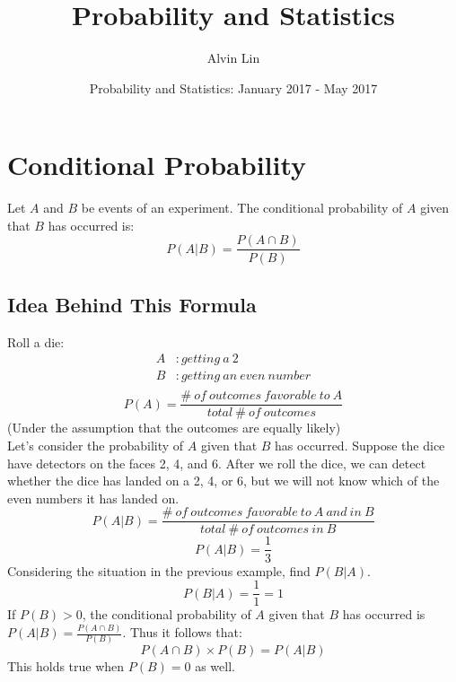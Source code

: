 \documentclass{math}
\title{Probability and Statistics}
\author{Alvin Lin}
\date{Probability and Statistics: January 2017 - May 2017}
\begin{document}
\maketitle

\section*{Conditional Probability}
Let \( A \) and \( B \) be events of an experiment. The conditional probability
of \( A \) given that \( B \) has occurred is:
\[ P(A|B) = \frac{P(A \cap B)}{P(B)} \]

\subsection*{Idea Behind This Formula}
Roll a die:
\begin{align*}
  A&: getting\ a\ 2 \\
  B&: getting\ an\ even\ number \\
\end{align*}
\[ P(A) = \frac{\#\ of\ outcomes\ favorable\ to\ A}{total\ \#\ of\ outcomes} \]
(Under the assumption that the outcomes are equally likely) \\

Let's consider the probability of \( A \) given that \( B \) has occurred.
Suppose the dice have detectors on the faces 2, 4, and 6. After we roll the
dice, we can detect whether the dice has landed on a 2, 4, or 6, but we will
not know which of the even numbers it has landed on.
\[ P(A|B) = \frac{\#\ of\ outcomes\ favorable\ to\ A\ and\ in\ B}
   {total\ \#\ of\ outcomes\ in\ B} \]
\[ P(A|B) = \frac{1}{3} \]
Considering the situation in the previous example, find \( P(B|A) \).
\[ P(B|A) = \frac{1}{1} = 1 \]
If \( P(B) > 0 \), the conditional probability of \( A \) given that \( B \)
has occurred is \( P(A|B) = \frac{P(A \cap B)}{P(B)} \). Thus it follows
that:
\[ P(A \cap B) \times P(B) = P(A|B) \]
This holds true when \( P(B) = 0 \) as well.
\end{document}
